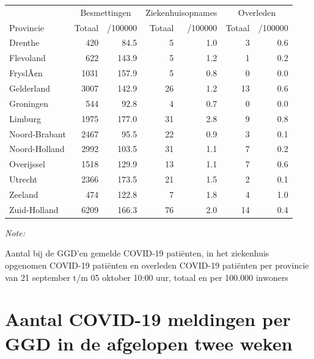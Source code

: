 \documentclass[
  english,
  man,floatsintext]{apa6}
\begin{document}
\begin{table}
\centering
\begin{threeparttable}
\begin{tabular}{lrrrrrr}
\toprule
\multicolumn{1}{c}{ } & \multicolumn{2}{c}{Besmettingen} & \multicolumn{2}{c}{Ziekenhuisopnames} & \multicolumn{2}{c}{Overleden} \\
\cmidrule(l{3pt}r{3pt}){2-3} \cmidrule(l{3pt}r{3pt}){4-5} \cmidrule(l{3pt}r{3pt}){6-7}
Provincie & Totaal & /100000 & Totaal & /100000 & Totaal & /100000\\
\midrule
Drenthe & 420 & 84.5 & 5 & 1.0 & 3 & 0.6\\
Flevoland & 622 & 143.9 & 5 & 1.2 & 1 & 0.2\\
FryslÃ¢n & 1031 & 157.9 & 5 & 0.8 & 0 & 0.0\\
Gelderland & 3007 & 142.9 & 26 & 1.2 & 13 & 0.6\\
Groningen & 544 & 92.8 & 4 & 0.7 & 0 & 0.0\\
Limburg & 1975 & 177.0 & 31 & 2.8 & 9 & 0.8\\
Noord-Brabant & 2467 & 95.5 & 22 & 0.9 & 3 & 0.1\\
Noord-Holland & 2992 & 103.5 & 31 & 1.1 & 7 & 0.2\\
Overijssel & 1518 & 129.9 & 13 & 1.1 & 7 & 0.6\\
Utrecht & 2366 & 173.5 & 21 & 1.5 & 2 & 0.1\\
Zeeland & 474 & 122.8 & 7 & 1.8 & 4 & 1.0\\
Zuid-Holland & 6209 & 166.3 & 76 & 2.0 & 14 & 0.4\\
\bottomrule
\end{tabular}
\begin{tablenotes}
\item \textit{Note: } 
\item Aantal bij de GGD’en gemelde COVID-19 patiënten, in het ziekenhuis opgenomen COVID-19 patiënten en overleden COVID-19 patiënten per provincie van 21 september t/m 05 oktober 10:00 uur, totaal en per 100.000 inwoners
\end{tablenotes}
\end{threeparttable}
\end{table}

\newpage

\hypertarget{aantal-covid-19-meldingen-per-ggd-in-de-afgelopen-twee-weken}{%
\section{Aantal COVID-19 meldingen per GGD in de afgelopen twee weken}\label{aantal-covid-19-meldingen-per-ggd-in-de-afgelopen-twee-weken}}
\end{document}
